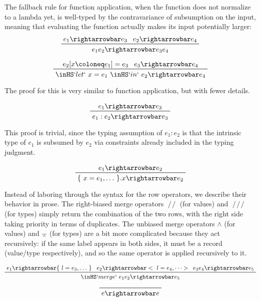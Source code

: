 \documentclass[11pt, twoside, reqno]{book}
\providecommand{\wedgeonwedge}{\barwedge}
\begin{document}
\begin{appdices}
The fallback rule for function application, when the function does not normalize to a lambda yet, is well-typed by the contravariance of subsumption on the input, meaning that evaluating the function actually makes its input potentially larger:
\begin{displaymath}
\prftree{e_1 \rightarrowbar e_3}{e_2 \rightarrowbar e_4}{e_1 e_2 \rightarrowbar e_3 e_4}
\end{displaymath}

\begin{displaymath}
\prftree{e_2[x \coloneq e_1] = e_3}{e_3 \rightarrowbar e_4}{\inHS`let`\ x = e_1\ \inHS`in`\ e_2 \rightarrowbar e_4}
\end{displaymath}

The proof for this is very similar to function application, but with fewer details.

\begin{displaymath}
\prftree{e_1 \rightarrowbar e_3}{e_1 : e_2 \rightarrowbar e_3}
\end{displaymath}

This proof is trivial, since the typing assumption of \(e_1 : e_2\) is that the intrinsic type of \(e_1\) is subsumed by \(e_2\) via constraints already included in the typing judgment.

\begin{displaymath}
\prftree{e_1 \rightarrowbar e_2}{\{\ x = e_1, \dots\ \}.x \rightarrowbar e_2}
\end{displaymath}

Instead of laboring through the syntax for the row operators, we describe their behavior in prose.
The right-biased merge operators \(\mathop{/\!/}\) (for values) and  \(\mathop{/\!/\!/}\) (for types) simply return the combination of the two rows, with the right side taking priority in terms of duplicates.
The unbiased merge operators \(\land\) (for values) and \(\wedgeonwedge\) (for types) are a bit more complicated because they act recursively: if the same label appears in both sides, it must be a record (value/type respectively), and so the same operator is applied recursively to it.

\begin{displaymath}
\prftree{e_1 \rightarrowbar \{\ l = e_3, \dots\ \}}{e_2 \rightarrowbar <\ l = e_4, \dots >}{e_3 e_4 \rightarrowbar e_5}{\inHS`merge`\ e_1 e_2 \rightarrowbar e_5}
\end{displaymath}

\begin{displaymath}
\prftree{e \rightarrowbar e}
\end{displaymath}


\end{appdices}
\end{document}

